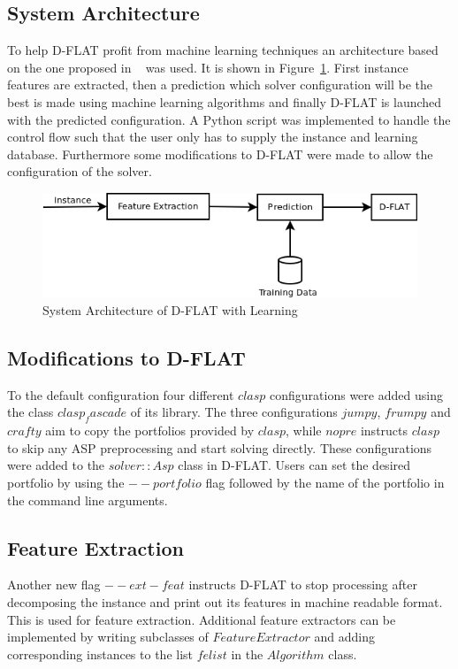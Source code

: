 \subsection{System Architecture}
To help \mbox{D-FLAT} profit from machine learning techniques an architecture based on the one proposed in ~\cite{claspfolio} was used. It is shown in Figure~\ref{impl:sysarch}. First instance features are extracted, then a prediction which solver configuration will be the best is made using machine learning algorithms and finally \mbox{D-FLAT} is launched with the predicted configuration.
A Python script was implemented to handle the control flow such that the user only has to supply the instance and learning database. Furthermore some modifications to \mbox{D-FLAT} were made to allow the configuration of the solver.

\begin{figure}[h]
	\center
	\includegraphics[scale=0.6]{figures/sysarch.png}
	\caption{System Architecture of \mbox{D-FLAT} with Learning\label{impl:sysarch}}
\end{figure}

\subsection{Modifications to \mbox{D-FLAT}}
To the default configuration four different \inline$clasp$ configurations were added using the class \inline$clasp_fascade$ of its library. The three configurations \inline$jumpy$, \inline$frumpy$ and \inline$crafty$ aim to copy the portfolios provided by \inline$clasp$, while \inline$nopre$ instructs \inline$clasp$ to skip any ASP preprocessing and start solving directly. These configurations were added to the \inline$solver::Asp$ class in \mbox{D-FLAT}. Users can set the desired portfolio by using the \inline$--portfolio$ flag followed by the name of the portfolio in the command line arguments.

\subsection{Feature Extraction}
Another new flag \inline$--ext-feat$ instructs \mbox{D-FLAT} to stop processing after decomposing the instance and print out its features in machine readable format. This is used for feature extraction. Additional feature extractors can be implemented by writing subclasses of \inline$FeatureExtractor$ and adding corresponding instances to the list \inline$felist$ in the \inline$Algorithm$ class.


